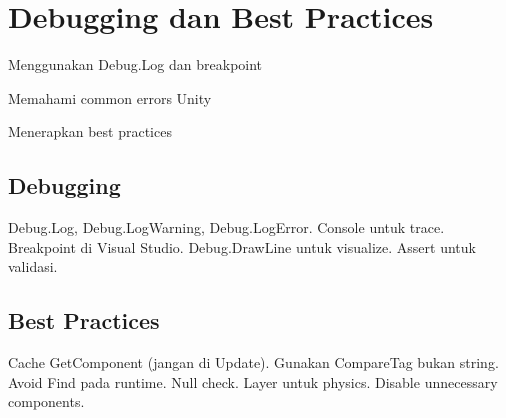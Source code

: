 \section{Debugging dan Best Practices}

\begin{learningoutcomes}
\item Menggunakan Debug.Log dan breakpoint
\item Memahami common errors Unity
\item Menerapkan best practices
\end{learningoutcomes}

\subsection{Debugging}

Debug.Log, Debug.LogWarning, Debug.LogError. Console untuk trace. Breakpoint di Visual Studio. Debug.DrawLine untuk visualize. Assert untuk validasi.

\subsection{Best Practices}

Cache GetComponent (jangan di Update). Gunakan CompareTag bukan string. Avoid Find pada runtime. Null check. Layer untuk physics. Disable unnecessary components.
